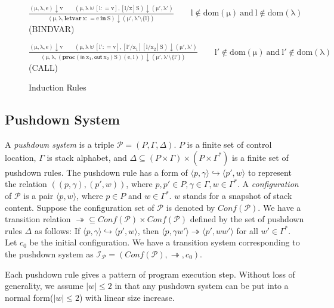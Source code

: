\documentclass{llncs}
\begin{document}
\begin{figure*}[t]
\begin{minipage}[t]{6.8in}
$\mathrm{\frac{\displaystyle(\mu,\lambda,e)\downarrow v\qquad
(\mu,\lambda\uplus[l\mathrel{\mathop:}= v],[l/x]S)\downarrow
(\mu',\lambda')}{\displaystyle (\mu,\lambda,\textbf{letvar}\
x\mathrel{\mathop:}= e\ \textbf{in}\ S)\downarrow
(\mu',\lambda'\setminus \{l\})}\qquad l\notin dom(\mu)\ and\ l
\notin dom(\lambda)}$\quad(BINDVAR)

$\mathrm{\frac{\displaystyle (\mu,\lambda,e)\downarrow v\qquad
(\mu,\lambda\uplus[l'\mathrel{\mathop:}=
v],[l'/x_1][l/x_2]S)\downarrow (\mu',\lambda')}{\displaystyle
(\mu,\lambda,(\textbf{proc}(\textsf{in}\ x_1,\textsf{out}\
x_2)S)(e,l))\downarrow (\mu',\lambda'\setminus \{l'\})}\qquad
l'\notin dom(\mu)\ and\ l'\notin dom(\lambda)}$\quad(CALL)
\end{minipage}
\caption{\label{fig:semantics}Induction Rules}
\end{figure*}

\subsection{\label{subsec:pds}Pushdown System}

\begin{definition}
A \emph{pushdown system} is a triple
$\mathcal{P}=(P,\Gamma,\Delta)$. $P$ is a finite set of control
location, $\Gamma$ is stack alphabet, and $\Delta\subseteq (P\times
\Gamma)\times (P\times {\Gamma}^*)$ is a finite set of pushdown
rules. The pushdown rule has a form of $\langle
p,\gamma\rangle\hookrightarrow  \langle p',w\rangle$ to represent
the relation $((p,\gamma),(p',w))$, where $p,p'\in P, \gamma\in
\Gamma, w\in \Gamma^*$. A \emph{configuration} of $\mathcal {P}$ is
a pair $\langle p,w\rangle$, where $p\in P$ and $w\in {\Gamma}^*$.
$w$ stands for a snapshot of stack content. Suppose the
configuration set of $\mathcal {P}$ is denoted by $Conf(\mathcal
{P})$. We have a transition relation $\twoheadrightarrow \subseteq
Conf(\mathcal {P})\times Conf(\mathcal {P})$ defined by the set of
pushdown rules $\Delta$ as follows: If $\langle p,\gamma\rangle
\hookrightarrow \langle p',w\rangle$, then $\langle p,\gamma
w'\rangle \twoheadrightarrow \langle p',ww'\rangle$ for all $w'\in
\Gamma^*$. Let $c_0$ be the initial configuration. We have a
transition system corresponding to the pushdown system as ${\mathcal
{I}}_{\mathcal {P}}=(Conf(\mathcal {P}),\twoheadrightarrow ,c_0).$
\end{definition}

Each pushdown rule gives a pattern of program execution step.
Without loss of generality, we assume $\mid w\mid \leq 2$ in that
any pushdown system can be put into a normal form($\mid w\mid \leq
2$) with linear size increase\cite{mcps:schwoon}.
\end{document}

